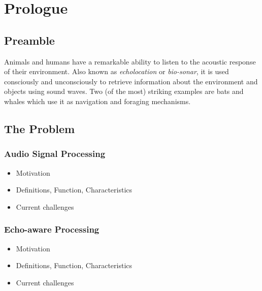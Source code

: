 \chapter{Prologue}\label{chap:intro}


\section{Preamble}
Animals and humans have a remarkable ability to listen to the acoustic response of their environment.
Also known as \emph{echolocation} or \emph{bio-sonar}, it is used consciously and unconsciously to retrieve
information about the environment and objects using sound waves.
Two (of the most) striking examples are bats and whales which use it as navigation and foraging mechanisms.



\section{The Problem}
\subsection{Audio Signal Processing}
\begin{itemize}
    \item Motivation
    \item Definitions, Function, Characteristics
    \item Current challenges
\end{itemize}
\subsection{Echo-aware Processing}
\begin{itemize}
    \item Motivation
    \item Definitions, Function, Characteristics
    \item Current challenges
\end{itemize}

